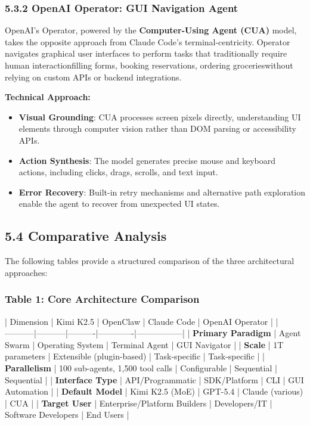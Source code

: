\subsubsection{5.3.2 OpenAI Operator: GUI Navigation Agent}

OpenAI's Operator, powered by the \textbf{Computer-Using Agent (CUA)} model, takes the opposite approach from Claude Code's terminal-centricity. Operator navigates graphical user interfaces to perform tasks that traditionally require human interactionfilling forms, booking reservations, ordering grocerieswithout relying on custom APIs or backend integrations.

\textbf{Technical Approach:}

\begin{itemize}
    \item \textbf{Visual Grounding}: CUA processes screen pixels directly, understanding UI elements through computer vision rather than DOM parsing or accessibility APIs.
    \item \textbf{Action Synthesis}: The model generates precise mouse and keyboard actions, including clicks, drags, scrolls, and text input.
    \item \textbf{Error Recovery}: Built-in retry mechanisms and alternative path exploration enable the agent to recover from unexpected UI states.

\end{itemize}
\subsection{5.4 Comparative Analysis}

The following tables provide a structured comparison of the three architectural approaches:

\subsubsection{Table 1: Core Architecture Comparison}

| Dimension | Kimi K2.5 | OpenClaw | Claude Code | OpenAI Operator |
|-----------|-----------|----------|-------------|-----------------|
| \textbf{Primary Paradigm} | Agent Swarm | Operating System | Terminal Agent | GUI Navigator |
| \textbf{Scale} | 1T parameters | Extensible (plugin-based) | Task-specific | Task-specific |
| \textbf{Parallelism} | 100 sub-agents, 1,500 tool calls | Configurable | Sequential | Sequential |
| \textbf{Interface Type} | API/Programmatic | SDK/Platform | CLI | GUI Automation |
| \textbf{Default Model} | Kimi K2.5 (MoE) | GPT-5.4 | Claude (various) | CUA |
| \textbf{Target User} | Enterprise/Platform Builders | Developers/IT | Software Developers | End Users |

